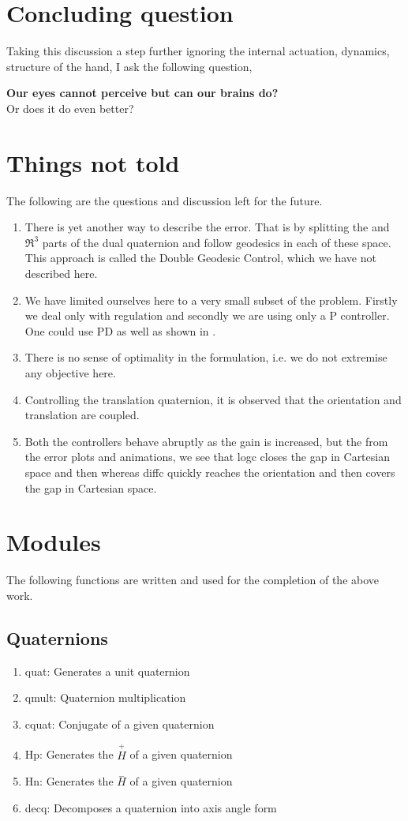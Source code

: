 \documentclass[a4paper,12pt]{article}
\newcommand{\Hp}{\ensuremath{\stackrel{+}{H}}\xspace}
\newcommand{\Hn}{\ensuremath{\stackrel{-}{H}}\xspace}
\begin{document}
\section{Concluding question}
Taking this discussion a step further ignoring the internal actuation, dynamics, structure of the hand, I ask the following question,
\begin{center}
	{\bf Our eyes cannot perceive \SE but can our brains do?}\\
	Or does it do even better?
\end{center}
\section{Things not told}
The following are the questions and discussion left for the future.
\begin{enumerate}
	\item There is yet another way to describe the error. That is by splitting the \SO and $\Re^3$ parts of the dual quaternion and follow geodesics in each of these space. This approach is called the Double Geodesic Control, which we have not described here.
	\item We have limited ourselves here to a very small subset of the problem. Firstly we deal only with regulation and secondly we are using only a P controller. One could use PD as well as shown in \cite{bullo1995proportional}.
	\item There is no sense of optimality in the formulation, i.e. we do not extremise any objective here.
	\item Controlling the translation quaternion, it is observed that the orientation and translation are coupled.
	\item Both the controllers behave abruptly as the gain is increased, but the from the error plots and animations, we see that logc closes the gap in Cartesian space and then \SO whereas diffc quickly reaches the orientation and then covers the gap in Cartesian space.
\end{enumerate}


\appendix
\section{Modules}
The following functions are written and used for the completion of the above work.
\subsection{Quaternions}
\begin{enumerate}
	\item quat: Generates a unit quaternion
	\item qmult: Quaternion multiplication
	\item cquat: Conjugate of a given quaternion
	\item Hp: Generates the \Hp of a given quaternion
	\item Hn: Generates the \Hn of a given quaternion
	\item decq: Decomposes a quaternion into axis angle form
\end{enumerate}
\end{document}
